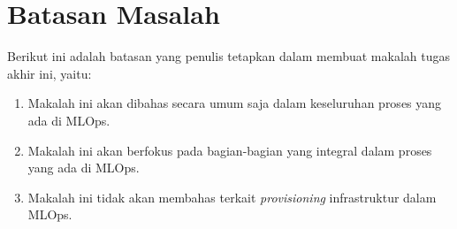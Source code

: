 \section{Batasan Masalah}

Berikut ini adalah batasan yang penulis tetapkan dalam membuat makalah tugas akhir ini, yaitu:

\begin{enumerate}
  \item Makalah ini akan dibahas secara umum saja dalam keseluruhan proses yang ada di MLOps.
  \item Makalah ini akan berfokus pada bagian-bagian yang integral dalam proses yang ada di MLOps.
  \item Makalah ini tidak akan membahas terkait \textit{provisioning} infrastruktur dalam MLOps. 
\end{enumerate}